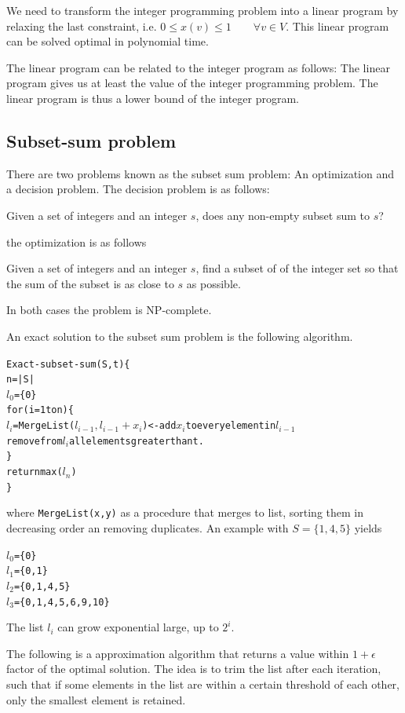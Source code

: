 \documentclass[10pt]{article}
\begin{document}
We need to transform the integer programming problem into a linear program by relaxing the last constraint, i.e. $0 \leq x(v) \leq 1 \qquad \forall v \in V$. This linear program can be solved optimal in polynomial time. 

The linear program can be related to the integer program as follows: The linear program gives us at least the value of the integer programming problem. The linear program is thus a lower bound of the integer program.

\subsection{Subset-sum problem} %
\label{sub:subset_sum_problem}
There are two problems known as the subset sum problem: An optimization and a decision problem. The decision problem is as follows:

\begin{definition}
Given a set of integers and an integer $s$, does any non-empty subset sum to $s$?  
\end{definition}
the optimization is as follows
\begin{definition}
Given a set of integers and an integer $s$, find a subset of of the integer set so that the sum of the subset is as close to $s$ as possible.
\end{definition}
In both cases the problem is NP-complete.


An exact solution to the subset sum problem is the following algorithm. 

\begin{alltt}
Exact-subset-sum(S,t)\{
  n = |S|
  \(l_0\) = \{0\}
  for(i=1 to n)\{
    \(l_i\) = MergeList(\(l_{i-1},l_{i-1}+x_i\))  <- add \(x_i\) to every element in \(l_{i-1}\)
    remove from \(l_i\) all elements greater than t.
  \}
  return max(\(l_n\))
\}  
\end{alltt}
where \texttt{MergeList(x,y)} as a procedure that merges to list, sorting them in decreasing order an removing duplicates. An example with $S = \{1, 4, 5\}$ yields

\begin{alltt}
\(l_0\) = \{0\}
\(l_1\) = \{0,1\}
\(l_2\) = \{0,1,4,5\}
\(l_3\) = \{0,1,4,5,6,9,10\}
\end{alltt}

The list $l_i$ can grow exponential large, up to $2^i$.

The following is a approximation algorithm that returns a value within $1+\epsilon$ factor of the optimal solution. The idea is to trim the list after each iteration, such that if some elements in the list are within a certain threshold of each other, only the smallest element is retained. 
\end{document}
